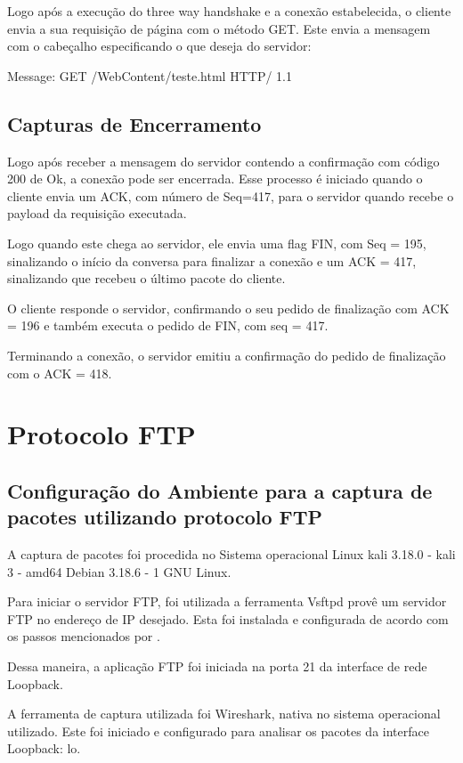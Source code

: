 Logo  após a execução do three way handshake e a conexão estabelecida, o cliente envia a sua
  requisição de página com o método GET. Este envia a mensagem com o cabeçalho especificando
  o que deseja do servidor:

Message: GET /WebContent/teste.html HTTP/ 1.1


\subsection{Capturas de Encerramento}
Logo após receber a mensagem do servidor contendo a confirmação com código 200 de Ok, a
conexão pode ser encerrada. Esse processo é iniciado quando o cliente envia um ACK, com
número de Seq=417, para o servidor quando recebe o payload da requisição executada.

Logo quando este chega ao servidor, ele envia uma flag FIN, com Seq = 195, sinalizando o
  início da conversa para finalizar a conexão e um ACK = 417, sinalizando que recebeu o
  último pacote do cliente.

O cliente responde o servidor, confirmando o seu pedido de finalização com ACK = 196 e
também executa o pedido de FIN, com seq = 417.

Terminando a conexão, o servidor emitiu a confirmação do pedido de finalização com o ACK = 418.


\section{Protocolo FTP}
\subsection{Configuração do Ambiente para a captura de pacotes utilizando protocolo FTP}
A captura de pacotes foi procedida no Sistema operacional Linux kali 3.18.0 - kali 3 - amd64
Debian 3.18.6 - 1 GNU Linux.

Para iniciar o servidor FTP, foi utilizada a ferramenta Vsftpd \cite{vsftpd} provê um servidor FTP no
endereço de IP desejado. Esta foi instalada e configurada de acordo com os passos mencionados por
\cite{instalacaovsftpd} .

Dessa maneira, a aplicação FTP foi iniciada na porta 21 da interface de rede Loopback.

A ferramenta de captura utilizada foi Wireshark, nativa no sistema operacional utilizado. Este foi iniciado e configurado para analisar os pacotes da interface Loopback: lo.


